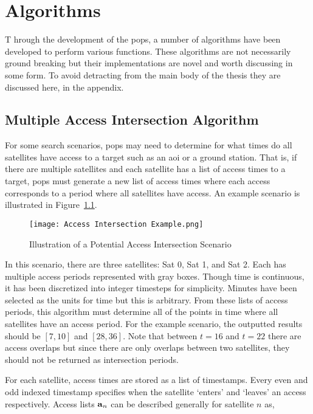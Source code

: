 \glsresetall{} 
\appendix

\chapter{Algorithms} \label{chap:Algorithms}

\lettrine[lines=2, findent=0pt, nindent=5pt]{T}{} hrough the development of the
\gls{pops}, a number of algorithms have been developed to perform various
functions. These algorithms are not necessarily ground breaking but their
implementations are novel and worth discussing in some form. To avoid
detracting from the main body of the thesis they are discussed here, in the
appendix.


\section{Multiple Access Intersection Algorithm} \label{alg:mul-access-inter}

For some search scenarios, \gls{pops} may need to determine for what times do all
satellites have access to a target such as an \gls{aoi} or a ground station.
That is, if there are multiple satellites and each satellite has a list of
access times to a target, \gls{pops} must generate a new list of access times where
each access corresponds to a period where all satellites have access. An
example scenario is illustrated in Figure~\ref{fig:access_intersect}.


\begin{figure}[h]
    \texttt{[image: Access Intersection Example.png]} 
    \caption{Illustration of a Potential Access Intersection Scenario}
\label{fig:access_intersect}
\end{figure}

In this scenario, there are three satellites: Sat 0, Sat 1, and Sat 2. Each has
multiple access periods represented with gray boxes. Though time is continuous,
it has been discretized into integer timesteps for simplicity. Minutes have
been selected as the units for time but this is arbitrary. From these lists of
access periods, this algorithm must determine all of the points in time where
all satellites have an access period. For the example scenario, the outputted
results should be $[7,10]$ and $[28,36]$. Note that between $t = 16$ and $t=22$
there are access overlaps but since there are only overlaps between two
satellites, they should not be returned as intersection periods.

For each satellite, access times are stored as a list of timestamps. Every even
and odd indexed timestamp specifies when the satellite `enters' and `leaves' an
access respectively. Access lists $\bm{\mathrm{a}}_{n}$ can be described generally for
satellite $n$ as,

